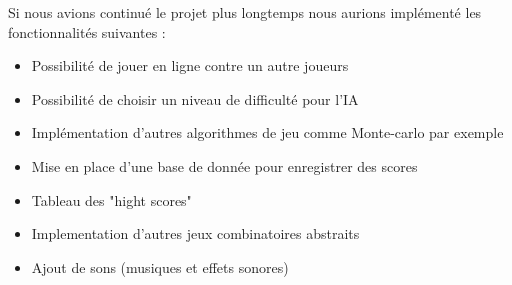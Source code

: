 Si nous avions continué le projet plus longtemps nous aurions implémenté les fonctionnalités suivantes :

\begin{itemize}
    \item Possibilité de jouer en ligne contre un autre joueurs
    \item Possibilité de choisir un niveau de difficulté pour l'IA
    \item Implémentation d'autres algorithmes de jeu comme Monte-carlo par exemple
    \item Mise en place d'une base de donnée pour enregistrer des scores
    \item Tableau des "hight scores"
    \item Implementation d'autres jeux combinatoires abstraits
    \item Ajout de sons (musiques et effets sonores)
\end{itemize}